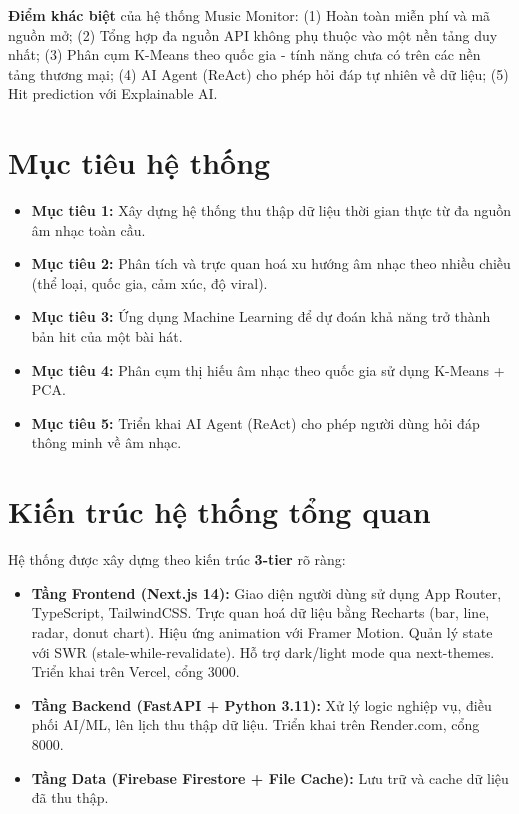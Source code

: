 \documentclass[12pt,a4paper]{report}
\begin{document}
\noindent
\textbf{Điểm khác biệt} của hệ thống Music Monitor: (1) Hoàn toàn miễn phí và mã nguồn mở; (2) Tổng hợp đa nguồn API không phụ thuộc vào một nền tảng duy nhất; (3) Phân cụm K-Means theo quốc gia - tính năng chưa có trên các nền tảng thương mại; (4) AI Agent (ReAct) cho phép hỏi đáp tự nhiên về dữ liệu; (5) Hit prediction với Explainable AI.

\section{Mục tiêu hệ thống}

\begin{itemize}
    \item \textbf{Mục tiêu 1:} Xây dựng hệ thống thu thập dữ liệu thời gian thực từ đa nguồn âm nhạc toàn cầu.
    \item \textbf{Mục tiêu 2:} Phân tích và trực quan hoá xu hướng âm nhạc theo nhiều chiều (thể loại, quốc gia, cảm xúc, độ viral).
    \item \textbf{Mục tiêu 3:} Ứng dụng Machine Learning để dự đoán khả năng trở thành bản hit của một bài hát.
    \item \textbf{Mục tiêu 4:} Phân cụm thị hiếu âm nhạc theo quốc gia sử dụng K-Means + PCA.
    \item \textbf{Mục tiêu 5:} Triển khai AI Agent (ReAct) cho phép người dùng hỏi đáp thông minh về âm nhạc.
\end{itemize}

\section{Kiến trúc hệ thống tổng quan}

Hệ thống được xây dựng theo kiến trúc \textbf{3-tier} rõ ràng:

\begin{itemize}
    \item \textbf{Tầng Frontend (Next.js 14):} Giao diện người dùng sử dụng App Router, TypeScript, TailwindCSS. Trực quan hoá dữ liệu bằng Recharts (bar, line, radar, donut chart). Hiệu ứng animation với Framer Motion. Quản lý state với SWR (stale-while-revalidate). Hỗ trợ dark/light mode qua next-themes. Triển khai trên Vercel, cổng 3000.
    \item \textbf{Tầng Backend (FastAPI + Python 3.11):} Xử lý logic nghiệp vụ, điều phối AI/ML, lên lịch thu thập dữ liệu. Triển khai trên Render.com, cổng 8000.
    \item \textbf{Tầng Data (Firebase Firestore + File Cache):} Lưu trữ và cache dữ liệu đã thu thập.
\end{itemize}
\end{document}
